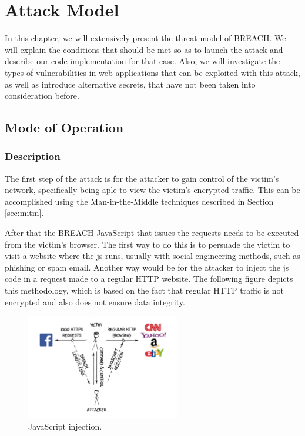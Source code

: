 \chapter{Attack Model}\label{ch:attack}

In this chapter, we will extensively present the threat model of BREACH. We will
explain the conditions that should be met so as to launch the attack and
describe our code implementation for that case. Also, we will investigate the
types of vulnerabilities in web applications that can be exploited with this
attack, as well as introduce alternative secrets, that have not been taken into
consideration before.

\section{Mode of Operation}\label{sec:mo}

\subsection{Description}

The first step of the attack is for the attacker to gain control of the victim's
network, specifically being aple to view the victim's encrypted traffic. This
can be accomplished using the Man-in-the-Middle techniques described in Section
\ref{sec:mitm}.

After that the BREACH JavaScript that issues the requests needs to be executed
from the victim's browser. The first way to do this is to persuade the victim to
visit a website where the js runs, usually with social engineering methods, such
as phishing or spam email. Another way would be for the attacker to inject the
js code in a request made to a regular HTTP website. The following figure
depicts this methodology, which is based on the fact that regular HTTP traffic
is not encrypted and also does not ensure data integrity.

\begin{figure}[H] \caption{JavaScript injection.} \centering
\includegraphics[width=0.6\textwidth]{diagrams/breach_mitm.png}\end{figure}

